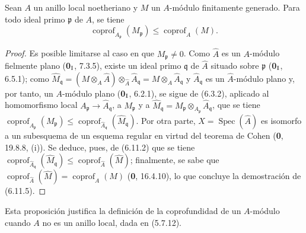 \begin{proposition}[6.11.5]
\label{IV.2.s6.11.5-fr}
Sean $A$ un anillo local noetheriano y $M$ un $A$-módulo finitamente generado. Para
todo ideal primo $\mathfrak p$ de $A$, se tiene
\begin{equation}
\operatorname{coprof}_{A_{\mathfrak p}}(M_{\mathfrak p})\leq
\operatorname{coprof}_A(M).
\tag{6.11.5.1}\label{IV.2.s6.11.5.1-fr}
\end{equation}
\end{proposition}

\begin{proof}
Es posible limitarse al caso en que $M_{\mathfrak p}\ne0$. Como $\widehat A$ es
un $A$-módulo fielmente plano (\textbf{0}$_{\rm I}$, 7.3.5), existe un ideal
primo $\mathfrak q$ de $\widehat A$ situado sobre $\mathfrak p$
(\textbf{0}$_{\rm I}$, 6.5.1); como
$\widehat M_{\mathfrak q}=(M\otimes_A\widehat A)\otimes_{\widehat A}\widehat A_{\mathfrak q}
=M\otimes_A\widehat A_{\mathfrak q}$ y
$\widehat A_{\mathfrak q}$ es un $\widehat A$-módulo plano y, por tanto, un
$A$-módulo plano (\textbf{0}$_{\rm I}$, 6.2.1), se sigue de (6.3.2),
aplicado al homomorfismo local
$A_{\mathfrak p}\to\widehat A_{\mathfrak q}$, a $M_{\mathfrak p}$ y a
$\widehat M_{\mathfrak q}=M_{\mathfrak p}\otimes_{A_{\mathfrak p}}\widehat A_{\mathfrak q}$, que se tiene
$\operatorname{coprof}_{A_{\mathfrak p}}(M_{\mathfrak p})\leq
\operatorname{coprof}_{\widehat A_{\mathfrak q}}
(\widehat M_{\mathfrak q})$. Por otra parte,
$X=\operatorname{Spec}(\widehat A)$ es isomorfo a un subesquema de un
esquema regular en virtud del teorema de Cohen (\textbf 0, 19.8.8, (i)). Se deduce,
pues, de (6.11.2) que se tiene
$\operatorname{coprof}_{\widehat A_{\mathfrak q}}
(\widehat M_{\mathfrak q})\leq
\operatorname{coprof}_{\widehat A}(\widehat M)$; finalmente, se sabe que
$\operatorname{coprof}_{\widehat A}(\widehat M)=
\operatorname{coprof}_A(M)$ (\textbf 0, 16.4.10), lo que concluye la demostración de
(6.11.5).
\end{proof}

Esta proposición justifica la definición de la coprofundidad de un
$A$-módulo cuando $A$ no es un anillo local, dada en (5.7.12).
